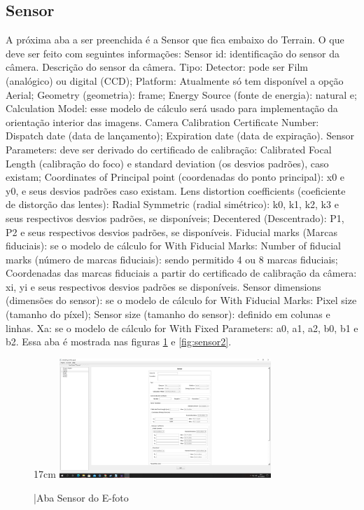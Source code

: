 \subsection{Sensor}
A próxima aba a ser preenchida é a Sensor que fica embaixo do Terrain. O que deve ser feito com seguintes informações: Sensor id: identificação do sensor da câmera. Descrição do sensor da câmera. Tipo: Detector: pode ser Film (analógico) ou digital (CCD); Platform: Atualmente só tem disponível a opção Aerial; Geometry (geometria): frame; Energy Source (fonte de energia): natural e; Calculation Model: esse modelo de cálculo será usado para implementação da orientação interior das imagens. Camera Calibration Certificate Number: Dispatch date (data de lançamento); Expiration date (data de expiração). Sensor Parameters: deve ser derivado do certificado de calibração: Calibrated Focal Length (calibração do foco) e standard deviation (os desvios padrões), caso existam; Coordinates of Principal point (coordenadas do ponto principal): x0 e y0, e seus desvios padrões caso existam. Lens distortion coefficients (coeficiente de distorção das lentes): Radial Symmetric (radial simétrico): k0, k1, k2, k3 e seus respectivos desvios padrões, se disponíveis; Decentered (Descentrado): P1, P2 e seus respectivos desvios padrões, se disponíveis. Fiducial marks (Marcas fiduciais): se o modelo de cálculo for With Fiducial Marks: Number of fiducial marks (número de marcas fiduciais): sendo permitido 4 ou 8 marcas fiduciais; Coordenadas das marcas fiduciais a partir do certificado de calibração da câmera: xi, yi e seus respectivos desvios padrões se disponíveis. Sensor dimensions (dimensões do sensor): se o modelo de cálculo for With Fiducial Marks: Pixel size (tamanho do píxel); Sensor size (tamanho do sensor): definido em colunas e linhas. Xa: se o modelo de cálculo for With Fixed Parameters: a0, a1, a2, b0, b1 e b2. Essa aba é mostrada nas figuras \ref{fig:sensor1} e \ref{fig:sensor2}.

\begin{figure}[!ht]{17cm}
	\centering
	\includegraphics[width=8cm]{Figuras/sensor1.jpg}
	\caption{|Aba Sensor do E-foto} \label{fig:sensor1}
\end{figure}

